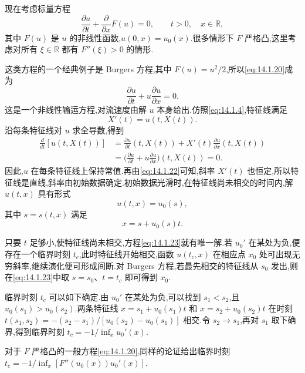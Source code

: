 现在考虑标量方程
\begin{equation}\label{eq:14.1.20}
  \frac{\partial u}{\partial t}+\frac{\partial}{\partial x}F(u)=0,
     \qquad t>0,\quad x\in\mathbb R,
\end{equation}
其中 \(F(u)\) 是 \(u\) 的非线性函数,\(u(0,x)=u_0(x)\).很多情形下 \(F\) 严格凸,这里考虑对所有 \(\xi\in\mathbb R\) 都有 \(F''(\xi)>0\) 的情形.

这类方程的一个经典例子是 Burgers 方程,其中 \(F(u)=u^2/2\),所以\eqref{eq:14.1.20}成为
\begin{equation}\label{eq:14.1.21}
  \frac{\partial u}{\partial t}+u\frac{\partial u}{\partial x}=0.
\end{equation}
这是一个非线性输运方程,对流速度由解 \(u\) 本身给出.仿照\eqref{eq:14.1.4},特征线满足
\begin{equation}\label{eq:14.1.22}
  X'(t)=u(t,X(t)).
\end{equation}
沿每条特征线对 \(u\) 求全导数,得到
\[
  \begin{aligned}
    \frac{d}{dt}[u(t,X(t))]
      &=\frac{\partial u}{\partial t}(t,X(t))
        +X'(t)\frac{\partial u}{\partial x}(t,X(t))\\
      &=\biggl(\frac{\partial u}{\partial t}
                +u\frac{\partial u}{\partial x}\biggr)(t,X(t))=0.
  \end{aligned}
\]
因此,\(u\) 在每条特征线上保持常值.再由\eqref{eq:14.1.22}可知,斜率 \(X'(t)\) 也恒定,所以特征线是直线,斜率由初始数据确定.初始数据光滑时,在特征线尚未相交的时间内,解 \(u(t,x)\) 具有形式
\[
  u(t,x)=u_0(s),
\]
其中 \(s=s(t,x)\) 满足
\begin{equation}\label{eq:14.1.23}
  x=s+u_0(s)t.
\end{equation}

只要 \(t\) 足够小,使特征线尚未相交,方程\eqref{eq:14.1.23}就有唯一解.若 \(u_0'\) 在某处为负,便存在一个临界时刻 \(t_c\),此时特征线开始相交,函数 \(u(t_c,x)\) 在相应点 \(x_0\) 处可出现无穷斜率,继续演化便可形成间断.对 Burgers 方程,若最先相交的特征线从 \(s_0\) 发出,则在\eqref{eq:14.1.23}中取 \(s=s_0\)、\(t=t_c\) 即可得到 \(x_0\).

临界时刻 \(t_c\) 可以如下确定.由 \(u_0'\) 在某处为负,可以找到 \(s_1<s_2\),且 \(u_0(s_1)>u_0(s_2)\).两条特征线 \(x=s_1+u_0(s_1)t\) 和 \(x=s_2+u_0(s_2)t\) 在时刻 \(t(s_1,s_2)=-(s_2-s_1)/[u_0(s_2)-u_0(s_1)]\) 相交.令 \(s_2\to s_1\),再对 \(s_1\) 取下确界,得到临界时刻 \(t_c=-1/\inf_x u_0'(x)\).

对于 \(F\) 严格凸的一般方程\eqref{eq:14.1.20},同样的论证给出临界时刻 \(t_c=-1/\inf_x[F''(u_0(x))u_0'(x)]\).

